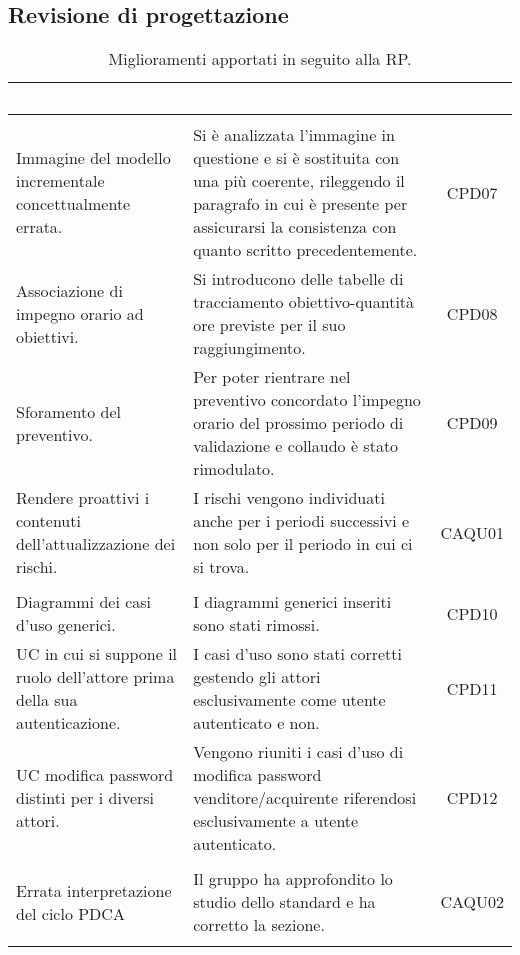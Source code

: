 \subsection{Revisione di progettazione}
\begin{longtable}{|C{4cm}|C{9cm}|c|}
	\textcolor{white}{\textbf{Osservazione}}&
	\textcolor{white}{\textbf{Soluzione adottata}}&
	\textcolor{white}{\textbf{ID}}\label{tab:CriticitàRP}\\ \hline
	\\ \hline
	Immagine del modello incrementale concettualmente errata. & Si è analizzata l'immagine in questione e si è sostituita con una più coerente, rileggendo il paragrafo in cui è presente per assicurarsi la consistenza con quanto scritto precedentemente. & CPD07  \\ \hline
	Associazione di impegno orario ad obiettivi. & Si introducono delle tabelle di tracciamento obiettivo-quantità ore previste per il suo raggiungimento. & CPD08 \\ \hline
	Sforamento del preventivo. & Per poter rientrare nel preventivo concordato l'impegno orario del prossimo periodo di validazione e collaudo è stato rimodulato. & CPD09 \\ \hline
	Rendere proattivi i contenuti dell'attualizzazione dei rischi. & I rischi vengono individuati anche per i periodi successivi e non solo per il periodo in cui ci si trova. & CAQU01 \\ \hline
	\\ \hline
	Diagrammi dei casi d'uso generici. & I diagrammi generici inseriti sono stati rimossi. & CPD10  \\ \hline
	UC in cui si suppone il ruolo dell'attore prima della sua autenticazione. & I casi d'uso sono stati corretti gestendo gli attori esclusivamente come utente autenticato e non. & CPD11 \\ \hline
	UC modifica password distinti per i diversi attori. & Vengono riuniti i casi d'uso di modifica password venditore/acquirente riferendosi esclusivamente a utente autenticato. & CPD12 \\ \hline
	\\ \hline
	Errata interpretazione del ciclo PDCA & Il gruppo ha approfondito lo studio dello standard e ha corretto la sezione. & CAQU02 \\ \hline
	\caption{Miglioramenti apportati in seguito alla RP.}\\
\end{longtable}